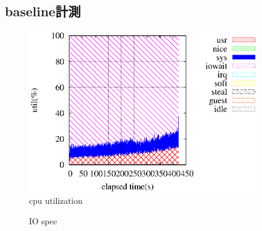 \documentclass[11pt,a4paper]{jsarticle}
\newlength{\subfigwidth}
\newlength{\subfigcolsep}
\begin{document}
\clearpage
\subsection{baseline計測}

\begin{figure}[thbp]
 \begin{center}
  \includegraphics[width=100mm]{1idxscan_ra2048core1.eps}
 \end{center}
 \caption{cpu utilization}
 \label{fig:1idx2048core1}
\end{figure}

\begin{figure}[thbp]
 \setlength{\subfigwidth}{.5\linewidth}
 \addtolength{\subfigwidth}{-.5\subfigcolsep}
 \begin{minipage}[b]{\subfigwidth}
 \end{minipage}
  \begin{minipage}[b]{\subfigwidth}
  \end{minipage}
  \caption{IO spec}
  \label{fig:1idxra2048}
\end{figure}
\end{document}
